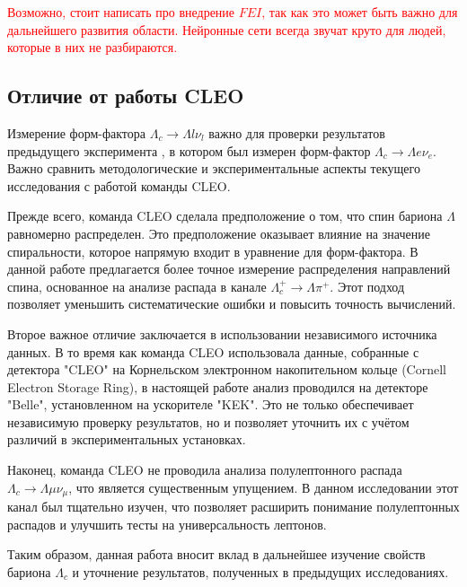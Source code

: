 \textcolor{red}{Возможно, стоит написать про внедрение $FEI$, так как это может быть важно для дальнейшего развития области. Нейронные сети всегда звучат круто для людей, которые в них не разбираются.}

\subsection{Отличие от работы CLEO}

Измерение форм-фактора $\Lambda_c \rightarrow \Lambda l \nu_l$ важно для проверки результатов предыдущего эксперимента \cite{CLEO2023}, в котором был измерен форм-фактор $\Lambda_c \rightarrow \Lambda e \nu_e$. Важно сравнить методологические и экспериментальные аспекты текущего исследования с работой команды CLEO.

Прежде всего, команда CLEO сделала предположение о том, что спин бариона $\Lambda$ равномерно распределен. Это предположение оказывает влияние на значение спиральности, которое напрямую входит в уравнение для форм-фактора. В данной работе предлагается более точное измерение распределения направлений спина, основанное на анализе распада в канале $\Lambda_c^+ \rightarrow \Lambda \pi^+$. Этот подход позволяет уменьшить систематические ошибки и повысить точность вычислений.

Второе важное отличие заключается в использовании независимого источника данных. В то время как команда CLEO использовала данные, собранные с детектора "CLEO" на Корнельском электронном накопительном кольце (Cornell Electron Storage Ring), в настоящей работе анализ проводился на детекторе "Belle", установленном на ускорителе "KEK". Это не только обеспечивает независимую проверку результатов, но и позволяет уточнить их с учётом различий в экспериментальных установках.

Наконец, команда CLEO не проводила анализа полулептонного распада $\Lambda_c \rightarrow \Lambda \mu \nu_\mu$, что является существенным упущением. В данном исследовании этот канал был тщательно изучен, что позволяет расширить понимание полулептонных распадов и улучшить тесты на универсальность лептонов.

Таким образом, данная работа вносит вклад в дальнейшее изучение свойств бариона $\Lambda_c$ и уточнение результатов, полученных в предыдущих исследованиях.
